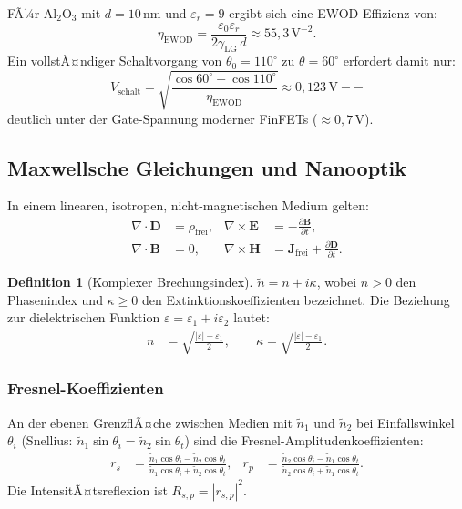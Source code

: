 ﻿\documentclass[a4paper,12pt]{scrreprt}
\theoremstyle{definition}
\newtheorem{definition}{Definition}[section]
\newcommand{\vect}[1]{\bm{#1}}
\begin{document}
FÃ¼r Al$_2$O$_3$ mit $d = 10$\,nm und $\varepsilon_r = 9$ ergibt sich eine
EWOD-Effizienz von:
\begin{equation}
  \eta_{\mathrm{EWOD}} = \frac{\varepsilon_0 \varepsilon_r}{2\gamma_{\mathrm{LG}}\, d}
  \approx 55{,}3\,\text{V}^{-2}.
\end{equation}
Ein vollstÃ¤ndiger Schaltvorgang von $\theta_0 = {110}^{\circ}$ zu $\theta = {60}^{\circ}$
erfordert damit nur:
\begin{equation}
  V_{\mathrm{schalt}} = \sqrt{\frac{\cos {60}^{\circ} - \cos {110}^{\circ}}{\eta_{\mathrm{EWOD}}}}
  \approx 0{,}123\,\text{V} -- 
\end{equation}
deutlich unter der Gate-Spannung moderner FinFETs ($\approx 0{,}7$\,V).

\subsection{Maxwellsche Gleichungen und Nanooptik}

In einem linearen, isotropen, nicht-magnetischen Medium gelten:
\begin{align}
  \nabla \cdot \vect{D} &= \rho_\mathrm{frei}, &
  \nabla \times \vect{E} &= -\frac{\partial \vect{B}}{\partial t}, \\
  \nabla \cdot \vect{B} &= 0, &
  \nabla \times \vect{H} &= \vect{J}_\mathrm{frei} + \frac{\partial \vect{D}}{\partial t}.
\end{align}

\begin{definition}[Komplexer Brechungsindex]
  \label{def:brechungsindex}
  $\tilde{n} = n + i\kappa$, wobei $n > 0$ den Phasenindex und $\kappa \geq 0$
  den Extinktionskoeffizienten bezeichnet. Die Beziehung zur dielektrischen
  Funktion $\varepsilon = \varepsilon_1 + i\varepsilon_2$ lautet:
  \begin{align}
    n &= \sqrt{\tfrac{|\varepsilon| + \varepsilon_1}{2}}, \qquad
    \kappa = \sqrt{\tfrac{|\varepsilon| - \varepsilon_1}{2}}.
  \end{align}
\end{definition}

\subsubsection{Fresnel-Koeffizienten}

An der ebenen GrenzflÃ¤che zwischen Medien mit $\tilde{n}_1$ und $\tilde{n}_2$
bei Einfallswinkel $\theta_i$ (Snellius: $\tilde{n}_1\sin\theta_i = \tilde{n}_2\sin\theta_t$)
sind die Fresnel-Amplitudenkoeffizienten:
\begin{align}
  r_s &= \frac{\tilde{n}_1 \cos\theta_i - \tilde{n}_2 \cos\theta_t}
  {\tilde{n}_1 \cos\theta_i + \tilde{n}_2 \cos\theta_t}, &
  r_p &= \frac{\tilde{n}_2 \cos\theta_i - \tilde{n}_1 \cos\theta_t}
  {\tilde{n}_2 \cos\theta_i + \tilde{n}_1 \cos\theta_t}.
\end{align}
Die IntensitÃ¤tsreflexion ist $R_{s,p} = |r_{s,p}|^2$.
\end{document}
